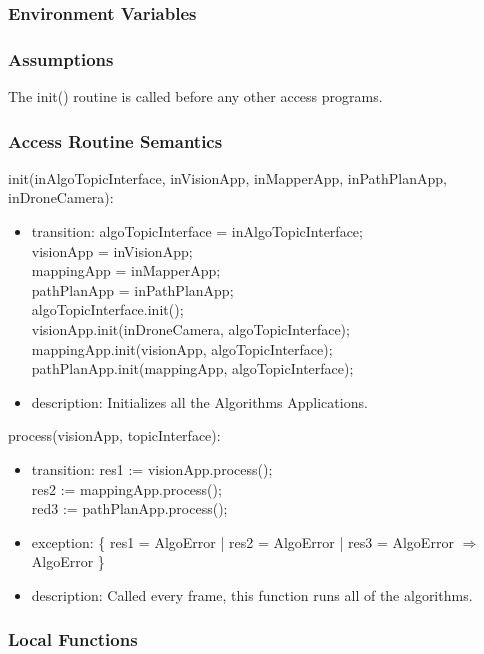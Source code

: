 \documentclass[12pt, titlepage]{article}
\begin{document}
\subsubsection{Environment Variables}
\subsubsection{Assumptions}
The init() routine is called before any other access programs.
\subsubsection{Access Routine Semantics}
\noindent init(inAlgoTopicInterface, inVisionApp, inMapperApp, inPathPlanApp, inDroneCamera):
\begin{itemize}
\item transition: 
algoTopicInterface = inAlgoTopicInterface; \\ 
visionApp = inVisionApp; \\
mappingApp = inMapperApp;\\
pathPlanApp = inPathPlanApp;\\
algoTopicInterface.init(); \\ 
visionApp.init(inDroneCamera, algoTopicInterface); \\ 
mappingApp.init(visionApp, algoTopicInterface); \\ 
pathPlanApp.init(mappingApp, algoTopicInterface); \\ 
\item description: Initializes all the Algorithms Applications.
\end{itemize}
\noindent process(visionApp, topicInterface):
\begin{itemize}
\item transition: res1 := visionApp.process(); \\
res2 := mappingApp.process(); \\
red3 := pathPlanApp.process(); \\
\item exception: \{ res1 = AlgoError | res2 = AlgoError | res3 = AlgoError $\Rightarrow$ AlgoError \}
\item description: Called every frame, this function runs all of the algorithms.
\end{itemize}
\subsubsection{Local Functions}
\newpage
\end{document}
